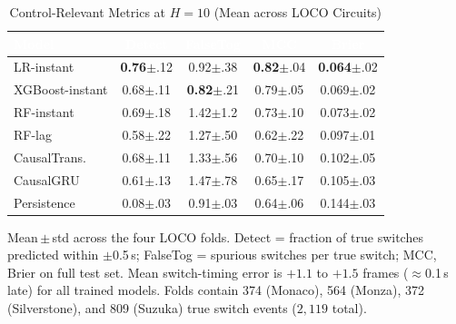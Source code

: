 \documentclass[conference,a4paper]{IEEEtran}
\begin{document}
\begin{table}[h]
\caption{Control-Relevant Metrics at $H{=}10$ (Mean across LOCO Circuits)}
\label{tab:eventmetrics}
\centering
\small
\renewcommand{\arraystretch}{1.25}
\begin{tabular}{lcccc}
\toprule
\rowcolor{hdrgreen}
\textcolor{white}{\textbf{Model}} &
\textcolor{white}{\textbf{Detect}} &
\textcolor{white}{\textbf{FalseTog}} &
\textcolor{white}{\textbf{MCC}} &
\textcolor{white}{\textbf{Brier}} \\
\midrule
\rowcolor{rowhighlight}
LR-instant      & \textbf{0.76}$\pm$.12 & 0.92$\pm$.38 & \textbf{0.82}$\pm$.04 & \textbf{0.064}$\pm$.02 \\
XGBoost-instant & 0.68$\pm$.11 & \textbf{0.82}$\pm$.21 & 0.79$\pm$.05 & 0.069$\pm$.02 \\
RF-instant      & 0.69$\pm$.18 & 1.42$\pm$1.2 & 0.73$\pm$.10 & 0.073$\pm$.02 \\
RF-lag          & 0.58$\pm$.22 & 1.27$\pm$.50 & 0.62$\pm$.22 & 0.097$\pm$.01 \\
CausalTrans.    & 0.68$\pm$.11 & 1.33$\pm$.56 & 0.70$\pm$.10 & 0.102$\pm$.05 \\
CausalGRU       & 0.61$\pm$.13 & 1.47$\pm$.78 & 0.65$\pm$.17 & 0.105$\pm$.03 \\
\midrule
Persistence     & 0.08$\pm$.03 & 0.91$\pm$.03 & 0.64$\pm$.06 & 0.144$\pm$.03 \\
\bottomrule
\end{tabular}
\begin{flushleft}
\footnotesize
Mean\,$\pm$\,std across the four LOCO folds. Detect = fraction of true switches predicted
within $\pm$0.5\,s; FalseTog = spurious switches per true switch; MCC, Brier on full test
set. Mean switch-timing error is $+1.1$ to $+1.5$ frames ($\approx$0.1\,s late) for all
trained models. Folds contain 374 (Monaco), 564 (Monza), 372 (Silverstone), and 809
(Suzuka) true switch events ($2{,}119$ total).
\end{flushleft}
\end{table}
\end{document}
